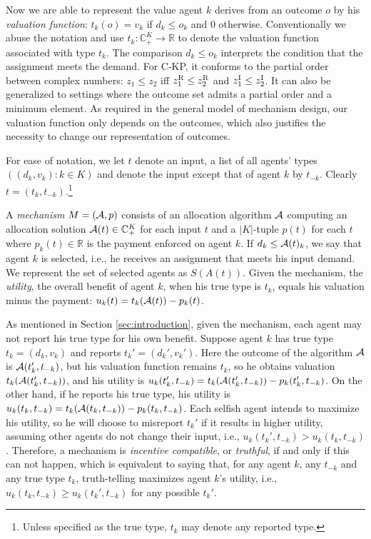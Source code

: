 \documentclass{aamas2013}
\begin{document}
Now we are able to represent the value agent $k$ derives from an outcome $o$ by his {\em valuation function}: $t_k(o)=v_k$ if $d_k\leq o_k$ and 0 otherwise.  Conventionally we abuse the notation and use $t_k:\mathbb{C}_+^{K}\rightarrow \mathbb{R}$ to denote the valuation function associated with type $t_k$.  The comparison $d_k\leq o_k$ interprets the condition that the assignment meets the demand.
For C-KP, it conforms to the partial order between complex numbers: $z_1\leq z_2$ iff $z_1^{\rm R}\leq z_2^{\rm R}$ and $z_1^{\rm I}\leq z_2^{\rm I}$.  It can also be generalized to settings where the outcome set admits a partial order and a minimum element.  As required in the general model of mechanism design, our valuation function only depends on the outcomes, which also justifies the necessity to change our representation of outcomes.  

For ease of notation, we let $t$ denote an input, a list of all agents' types $((d_k,v_k):k\in K)$ and denote the input except that of agent $k$ by $t_{-k}$.  Clearly $t=(t_k,t_{-k})$.\footnote{Unless specified as the true type, $t_k$ may denote any reported type.}

A {\em mechanism} $M=({\cal A},p)$ consists of an allocation algorithm $\cal A$ computing an allocation solution ${\cal A}(t)\in \mathbb{C}_+^{K}$ for each input $t$ and a $|K|$-tuple $p(t)$ for each $t$ where $p_k(t)\in \mathbb{R}$ is the payment enforced on agent $k$.  If $d_k\leq {\cal A}(t)_k$, we say that agent $k$ is selected, i.e., he receives an assignment that meets his input demand.  We represent the set of selected agents as $S(A(t))$. 
Given the mechanism, the {\em utility}, the overall benefit of agent $k$, when his true type is $t_k$, equals his valuation minus the payment: $u_k(t)= t_k({\cal A}(t))-p_k(t)$.

As mentioned in Section \ref{sec:introduction}, given the mechanism, each agent may not report his true type for his own benefit.  Suppose agent $k$ has true type $t_k=(d_k, v_k)$ and reports $t_k'=(d_k', v_k')$.  Here the outcome of the algorithm $\cal A$ is ${\cal A}(t_k',t_{-k})$, but his valuation function remains $t_k$, so he obtains valuation $t_k({\cal A}(t_k',t_{-k}))$, and his utility is $u_k(t_k',t_{-k})= t_k({\cal A}(t_k',t_{-k}))-p_k(t_k',t_{-k})$.  On the other hand, if he reports his true type, his utility is $u_k(t_k,t_{-k})= t_k({\cal A}(t_k,t_{-k}))-p_k(t_k,t_{-k})$.  Each selfish agent intends to maximize his utility, so he will choose to misreport $t_k'$ if it results in higher utility, assuming other agents do not change their input, i.e., $u_k(t_k',t_{-k})> u_k(t_k,t_{-k})$.  Therefore, a mechanism is {\em incentive compatible}, or {\em truthful}, if and only if this can not happen, which is equivalent to saying that, for any agent $k$, any $t_{-k}$ and any true type $t_k$, truth-telling maximizes agent $k$'s utility, i.e., $u_k(t_k,t_{-k})\geq u_k(t_k',t_{-k})$ for any possible $t_k'$.    
\end{document}
